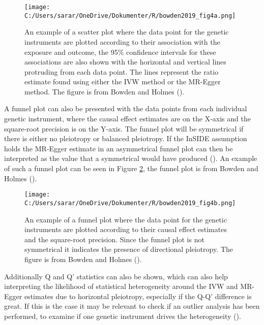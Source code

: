 \documentclass[
]{article}
\begin{document}
\begin{figure}
\centering
\texttt{[image: C:/Users/sarar/OneDrive/Dokumenter/R/bowden2019\_fig4a.png]}
\caption{An example of a scatter plot where the data point for the
genetic instruments are plotted according to their association with the
exposure and outcome, the 95\% confidence intervals for these
associations are also shown with the horizontal and vertical lines
protruding from each data point. The lines represent the ratio estimate
found using either the IVW method or the MR-Egger method. The figure is
from Bowden and Holmes ().
\label{scatterplot_example}}
\end{figure}

A funnel plot can also be presented with the data points from each
individual genetic instrument, where the causal effect estimates are on
the X-axis and the square-root precision is on the Y-axis. The funnel
plot will be symmetrical if there is either no pleiotropy or balanced
pleiotropy. If the InSIDE assumption holds the MR-Egger estimate in an
asymmetrical funnel plot can then be interpreted as the value that a
symmetrical would have produced (). An example of such a funnel plot can be seen in Figure
\ref{funnelplot_example}, the funnel plot is from Bowden and Holmes
().

\begin{figure}
\centering
\texttt{[image: C:/Users/sarar/OneDrive/Dokumenter/R/bowden2019\_fig4b.png]}
\caption{An example of a funnel plot where the data point for the
genetic instruments are plotted according to their causal effect
estimates and the square-root precision. Since the funnel plot is not
symmetrical it indicates the presence of directional pleiotropy. The
figure is from Bowden and Holmes
().\label{funnelplot_example}}
\end{figure}

Additionally Q and Q' statistics can also be shown, which can also help
interpreting the likelihood of statistical heterogeneity around the IVW
and MR-Egger estimates due to horizontal pleiotropy, especially if the
Q-Q' difference is great. If this is the case it may be relevant to
check if an outlier analysis has been performed, to examine if one
genetic instrument drives the heterogeneity
().
\end{document}
